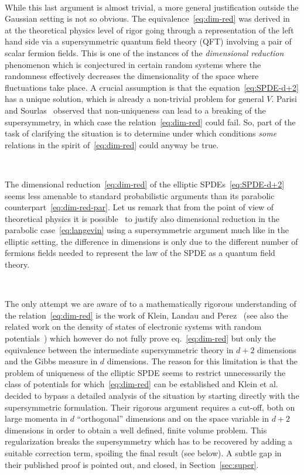 \documentclass[a4paper,10pt]{article}
\newcommand{\tmtextit}[1]{{\itshape{#1}}}
\begin{document}
\

While this last argument is almost trivial, a more general justification
outside the Gaussian setting is not so obvious. The
equivalence~{\eqref{eq:dim-red}} was derived
in~{\cite{parisi_random_1979,parisi_supersymmetric_1982}} at the theoretical
physics level of rigor going through a representation of the left hand side
via a supersymmetric quantum field theory (QFT) involving a pair of scalar
fermion fields. This is one of the instances of the \tmtextit{dimensional
reduction} phenomenon which is conjectured in certain random systems where the
randomness effectively decreases the dimensionality of the space where
fluctuations take place. A crucial assumption is that the
equation~{\eqref{eq:SPDE-d+2}} has a unique solution, which is already a
non-trivial problem for general $V$. Parisi and
Sourlas~{\cite{parisi_supersymmetric_1982}} observed that non-uniqueness can
lead to a breaking of the supersymmetry, in which case the
relation~{\eqref{eq:dim-red}} could fail. So, part of the task of clarifying
the situation is to determine under which conditions \tmtextit{some} relations
in the spirit of~{\eqref{eq:dim-red}} could anyway be true.

\

The dimensional reduction~{\eqref{eq:dim-red}} of the elliptic
SPDEs~{\eqref{eq:SPDE-d+2}} seems less amenable to standard probabilistic
arguments than its parabolic counterpart~{\eqref{eq:dim-red-par}}. Let us
remark that from the point of view of theoretical physics it is
possible~{\cite{damgaard_stochastic_1988,parisi_supersymmetric_1982}} to
justify also dimensional reduction in the parabolic case~{\eqref{eq:langevin}}
using a supersymmetric argument much like in the elliptic setting, the
difference in dimensions is only due to the different number of fermions
fields needed to represent the law of the SPDE as a quantum field theory.

\

The only attempt we are aware of to a mathematically rigorous understanding
of the relation~{\eqref{eq:dim-red}} is the work of Klein, Landau and
Perez~{\cite{klein_supersymmetry_1985,Klein1984,klein_supersymmetry_1983}}
(see also the related work on the density of states of electronic systems with
random potentials~{\cite{klein_density_1985}}) which however do not fully
prove eq.~{\eqref{eq:dim-red}} but only the equivalence between the
intermediate supersymmetric theory in $d + 2$ dimensions and the Gibbs measure
in $d$ dimensions. The reason for this limitation is that the problem of
uniqueness of the elliptic SPDE seems to restrict unnecessarily the class of
potentials for which~{\eqref{eq:dim-red}} can be established and Klein et al.
decided to bypass a detailed analysis of the situation by starting directly
with the supersymmetric formulation. Their rigorous argument requires a
cut-off, both on large momenta in $d$ ``orthogonal'' dimensions and on the
space variable in $d + 2$ dimensions in order to obtain a well defined, finite
volume problem. This regularization breaks the supersymmetry which has to be
recovered by adding a suitable correction term, spoiling the final result (see
below). A subtle gap in their published proof is pointed out, and closed, in
Section~\ref{sec:super}.
\end{document}
